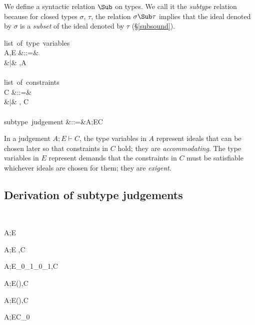 \documentclass{amsart}
\theoremstyle{definition}
\begin{document}
We define a syntactic relation $\Sub$ on types. We call it the
\emph{subtype} relation because for closed types $\sigma$,
$\tau$, the relation $\sigma \Sub \tau$ implies that the ideal
denoted by $\sigma$ is a \emph{subset} of the ideal denoted by
$\tau$ (\S\ref{subsound}).
\begin{syntax}
\mbox{list of type variables}\\
A,E
&::=& \emptyset \\
&|& \alpha,A
\\
\\
\mbox{list of constraints}\\
C
&::=& \emptyset \\
&|& \sigma \Sub \tau, C
\\
\\
\mbox{subtype judgement}
&::=&A;E\vdash C
\end{syntax}%
In a judgement $A;E\vdash C$, the type variables in $A$ represent
ideals that can be chosen later so that constraints in $C$ hold;
they are \emph{accommodating}. The type variables in $E$
represent demands that the constraints in $C$ must be satisfiable
whichever ideals are chosen for them; they are \emph{exigent}.

\subsection{Derivation of subtype judgements}~

\infrule[S-vacuous]
{}
{A;E\vdash\emptyset}

{A;E \vdash \tau\Sub\tau,C}

{A;E\vdash\sigma_0\R\sigma_1\Sub\tau_0\R\tau_1,C}


{A;E\vdash(\All\alpha\sigma)\Sub\tau,C}

{A;E\vdash\sigma\Sub(\All\alpha\tau),C}

{A;E\vdash C_0}
\end{document}
